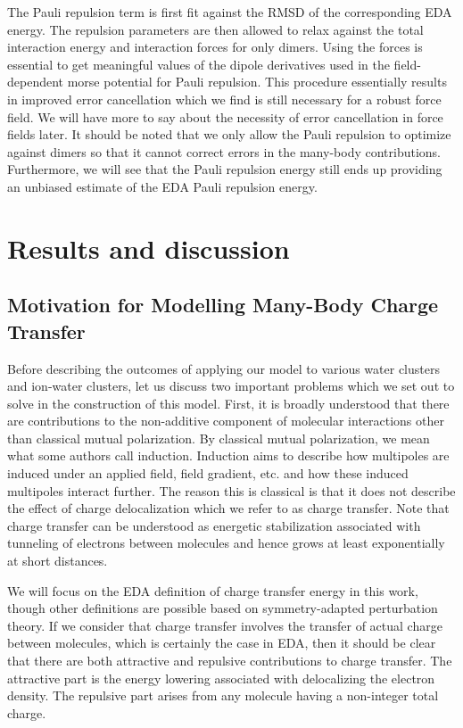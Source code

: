 \documentclass[journal=jacsat,manuscript=article]{achemso}
\begin{document}
The Pauli repulsion term is first fit against the RMSD of the corresponding EDA energy.
The repulsion parameters are then allowed to relax against the total interaction energy
and interaction forces for only dimers. Using the forces is essential to get meaningful
values of the dipole derivatives used in the field-dependent morse potential for Pauli
repulsion. This procedure essentially results in improved error cancellation
which we find is still necessary for a robust force field. We will have more to say about the necessity
of error cancellation in force fields later. It should be noted that we only allow
the Pauli repulsion to optimize against dimers so that it cannot correct errors
in the many-body contributions. Furthermore, we will see that the Pauli repulsion energy
still ends up providing an unbiased estimate of the EDA Pauli repulsion energy.

\section*{Results and discussion}
\subsection*{Motivation for Modelling Many-Body Charge Transfer}

Before describing the outcomes of applying our model to various water clusters and
ion-water clusters, let us discuss two important problems which we set out to solve
in the construction of this model. First, it is broadly understood that there are
contributions to the non-additive component of molecular interactions other than
classical mutual polarization. By classical mutual polarization, we mean what some
authors call induction.\cite{herman2023accurate} Induction aims to describe
how multipoles are induced under an applied field, field gradient, etc.
and how these induced multipoles interact further. The reason this is classical
is that it does not describe the effect of charge delocalization which we refer to
as charge transfer. Note that charge transfer can be understood as energetic
stabilization associated with tunneling of electrons between molecules
and hence grows at least exponentially at short distances.\cite{misquitta2013charge}

We will focus on the EDA definition of charge transfer energy in this work, though
other definitions are possible based on symmetry-adapted perturbation theory.\cite{stone2009charge,misquitta2013charge}
If we consider that charge transfer involves the transfer of actual charge between
molecules, which is certainly the case in EDA\cite{thirman2018characterizing},
then it should be clear that there are both attractive and repulsive contributions
to charge transfer. The attractive part is the energy lowering associated with delocalizing
the electron density. The repulsive part arises from any molecule having a non-integer
total charge.
\end{document}
